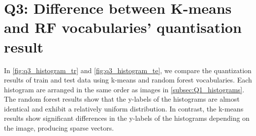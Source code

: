 \begin{table}[htbp]
	\centering
	\setlength{\tabcolsep}{6pt} %
	\renewcommand{\arraystretch}{1.5} %
	\caption{Theoretical properties of vocabulary method: K-means and RF}
	\label{table:q3-app-1}
\end{table}

\section{Q3: Difference between K-means and RF vocabularies' quantisation result}
In \cref{fig:q3_histogram_tr} and \cref{fig:q3_histogram_te}, we compare the quantization results of train and test data using k-means and random forest vocabularies. Each histogram are arranged in the same order as images in \cref{subsec:Q1_histograms}. The random forest results show that the y-labels of the histograms are almost identical and exhibit a relatively uniform distribution. In contrast, the k-means results show significant differences in the y-labels of the histograms depending on the image, producing sparse vectors.


